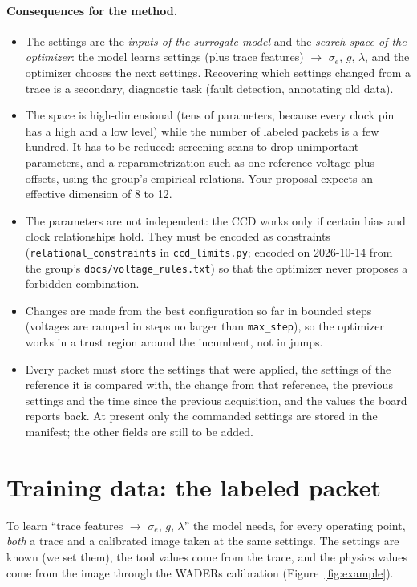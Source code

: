 \documentclass[11pt]{article}
\newcommand{\code}[1]{\texttt{#1}}
\begin{document}
\paragraph{Consequences for the method.}
\begin{itemize}
  \item The settings are the \emph{inputs of the surrogate model} and the \emph{search space of the optimizer}: the model learns
        settings (plus trace features) $\rightarrow$ $\sigma_e$, $g$, $\lambda$, and the optimizer chooses the next settings. Recovering which
        settings changed from a trace is a secondary, diagnostic task (fault detection, annotating old data).
  \item The space is high-dimensional (tens of parameters, because every clock pin has a high and a low level) while the number of
        labeled packets is a few hundred. It has to be reduced: screening scans to drop unimportant parameters, and a
        reparametrization such as one reference voltage plus offsets, using the group's empirical relations. Your proposal expects an effective
        dimension of 8 to 12.
  \item The parameters are not independent: the CCD works only if certain bias and clock relationships hold. They must be encoded as
        constraints (\code{relational\_constraints} in \code{ccd\_limits.py}; encoded on 2026-10-14 from the group's
        \code{docs/voltage\_rules.txt}) so that the optimizer never proposes a forbidden
        combination.
  \item Changes are made from the best configuration so far in bounded steps (voltages are ramped in steps no larger than \code{max\_step}),
        so the optimizer works in a trust region around the incumbent, not in jumps.
  \item Every packet must store the settings that were applied, the settings of the reference it is compared with, the change from that
        reference, the previous settings and the time since the previous acquisition, and the values the board reports back. At present
        only the commanded settings are stored in the manifest; the other fields are still to be added.
\end{itemize}

\section{Training data: the labeled packet}

To learn ``trace features $\rightarrow$ $\sigma_e$, $g$, $\lambda$'' the model needs, for every operating point, \emph{both} a trace
and a calibrated image taken at the same settings. The settings are known (we set them), the tool values come from the trace,
and the physics values come from the image through the WADERs calibration (Figure~\ref{fig:example}).
\end{document}
